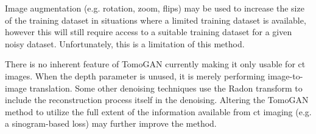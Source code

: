 Image augmentation (e.g. rotation, zoom, flips) may be used to increase the size of the training dataset in situations where a limited training dataset is available, however this will still require access to a suitable training dataset for a given noisy dataset. Unfortunately, this is a limitation of this method. 

There is no inherent feature of TomoGAN currently making it only usable for \gls{ct} images. When the depth parameter is unused, it is merely performing image-to-image translation. Some other denoising techniques use the Radon transform to include the reconstruction process itself in the denoising. Altering the TomoGAN method to utilize the full extent of the information available from \gls{ct} imaging (e.g. a sinogram-based loss) may further improve the method. 